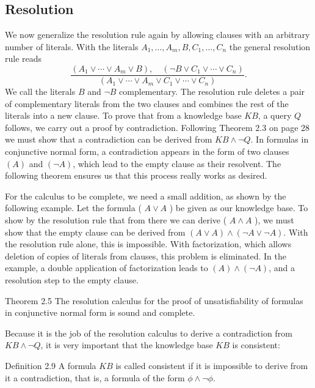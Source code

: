 \documentclass[10pt]{book}
\begin{document}
\subsection{Resolution}
We now generalize the resolution rule again by allowing clauses with an arbitrary number of literals. With the literals $A_{1}, \ldots, A_{m}, B, C_{1}, \ldots, C_{n}$ the general resolution rule reads
\begin{equation*}
\frac{\left(A_{1} \vee \cdots \vee A_{m} \vee B\right), \quad\left(\neg B \vee C_{1} \vee \cdots \vee C_{n}\right)}{\left(A_{1} \vee \cdots \vee A_{m} \vee C_{1} \vee \cdots \vee C_{n}\right)} . \tag{2.2}
\end{equation*}
We call the literals $B$ and $\neg B$ complementary. The resolution rule deletes a pair of complementary literals from the two clauses and combines the rest of the literals into a new clause.
To prove that from a knowledge base $K B$, a query $Q$ follows, we carry out a proof by contradiction. Following Theorem 2.3 on page 28 we must show that a contradiction can be derived from $K B \wedge \neg Q$. In formulas in conjunctive normal form, a contradiction appears in the form of two clauses $(A)$ and $(\neg A)$, which lead to the empty clause as their resolvent. The following theorem ensures us that this process really works as desired.

For the calculus to be complete, we need a small addition, as shown by the following example. Let the formula ( $A \vee A$ ) be given as our knowledge base. To show by the resolution rule that from there we can derive ( $A \wedge A$ ), we must show that the empty clause can be derived from $(A \vee A) \wedge(\neg A \vee \neg A)$. With the resolution rule alone, this is impossible. With factorization, which allows deletion of copies of literals from clauses, this problem is eliminated. In the example, a double application of factorization leads to $(A) \wedge(\neg A)$, and a resolution step to the empty clause.

\begin{displayquote}
Theorem 2.5 The resolution calculus for the proof of unsatisfiability of formulas in conjunctive normal form is sound and complete.
\end{displayquote}

Because it is the job of the resolution calculus to derive a contradiction from $K B \wedge \neg Q$, it is very important that the knowledge base $K B$ is consistent:

Definition 2.9 A formula $K B$ is called consistent if it is impossible to derive from it a contradiction, that is, a formula of the form $\phi \wedge \neg \phi$.
\end{document}
